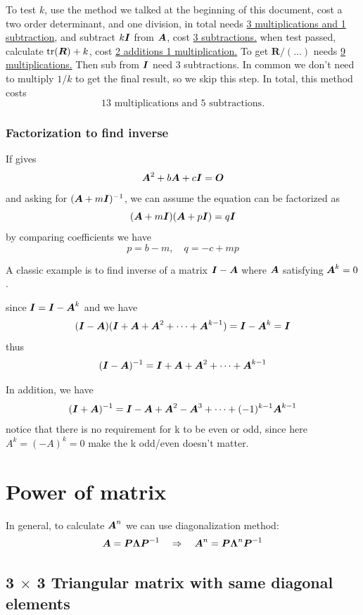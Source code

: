 \documentclass{overview}
\begin{document}
To test $k$, use the method we talked at the beginning of this document, cost
a two order determinant, and one division, in total needs \underline{3 multiplications and
1 subtraction}, and subtract $k\boldsymbol{I}$ from $\boldsymbol{A}$, cost \underline{3 subtractions.}
when test passed, calculate $\operatorname{tr}(\boldsymbol{R})+k$, cost \underline{2 additions 1 multiplication.}
To get $\boldsymbol{R}/(...)$ needs \underline{9 multiplications.}
Then sub from $\boldsymbol{I}$ need {3 subtractions}. In common we don't need to multiply $1/k$
to get the final result, so we skip this step.
In total, this method costs
\[
	\boxed{
		13 \text{ multiplications and } 5 \text{ subtractions.}
	}
\]

\subsubsection{Factorization to find inverse}

If gives
\[
	\boldsymbol{A}^2+b\boldsymbol{A}+c\boldsymbol{I}=\boldsymbol{O}
\] 
and asking for $(\boldsymbol{A}+m\boldsymbol{I})^{-1}$, we can assume the equation can be factorized as
\[
  (\boldsymbol{A}+m\boldsymbol{I})(\boldsymbol{A}+p\boldsymbol{I})=q\boldsymbol{I}
\] 
by comparing coefficients we have
\[
	p=b - m, \quad q=-c+mp
\] 

A classic example is to find inverse of a matrix $\boldsymbol{I}-\boldsymbol{A}$ where $\boldsymbol{A}$ satisfying $\boldsymbol{A}^{k}=0$.
\begin{answer}
	since $\boldsymbol{I}=\boldsymbol{I}-\boldsymbol{A}^{k}$
and we have
\[
	(\boldsymbol{I}-\boldsymbol{A})(\boldsymbol{I}+\boldsymbol{A}+\boldsymbol{A}^{2}+\cdots+\boldsymbol{A}^{k-1})=\boldsymbol{I}-\boldsymbol{A}^{k}=\boldsymbol{I}
\]
thus
\[
	(\boldsymbol{I}-\boldsymbol{A})^{-1}=\boldsymbol{I}+\boldsymbol{A}+\boldsymbol{A}^{2}+\cdots+\boldsymbol{A}^{k-1}
\]
\end{answer}

In addition, we have
\[
	(\boldsymbol{I}+\boldsymbol{A})^{-1}=\boldsymbol{I}-\boldsymbol{A}+\boldsymbol{A}^{2}-\boldsymbol{A}^{3}+\cdots+(-1)^{k-1}\boldsymbol{A}^{k-1}
\] 
notice that there is no requirement for k to be even or odd, since here 
$A^{k}=(-A)^{k}=0$ make the k odd/even doesn't matter.


\section{Power of matrix}

In general, to calculate $\boldsymbol{A}^{n}$ we can use diagonalization method:
\[
	\boldsymbol{A} = \boldsymbol{P} \boldsymbol{\Lambda} \boldsymbol{P}^{-1} \quad \Rightarrow \quad
	\boldsymbol{A}^{n} = \boldsymbol{P} \boldsymbol{\Lambda}^{n} \boldsymbol{P}^{-1}
\]

\subsection{3 $\times$ 3 Triangular matrix with same diagonal elements}
\end{document}
